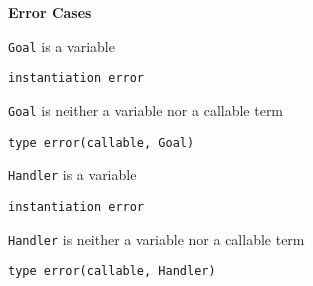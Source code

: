 \begin{description}
{\bf Error Cases}
\begin{description}
\item  {\tt Goal} is a variable
\bi
\item {\tt instantiation error}
\ei
\item  {\tt Goal} is neither a variable nor a callable term
\bi
\item  {\tt type error(callable, Goal)}
\ei
\item  {\tt Handler} is a variable
\bi
\item  {\tt instantiation error}
\ei
\item  {\tt Handler} is neither a variable nor a callable term
\bi
\item {\tt type error(callable, Handler)}
\ei
\end{description}

\end{description}



